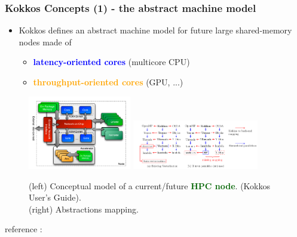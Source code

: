 \begin{frame}
  \frametitle{Kokkos Concepts (1) - the abstract machine model}

  \begin{itemize}
  \item Kokkos defines an abstract machine model for future large shared-memory nodes made of
    \begin{itemize}
    \item \textcolor{blue}{\bf latency-oriented cores} (multicore CPU)
    \item \textcolor{orange}{\bf throughput-oriented cores} (GPU, ...)
    \end{itemize}
  \end{itemize}

  \begin{center}
    \begin{figure}
      \includegraphics[width=4.5cm]{images/kokkos_machine_model}
      \includegraphics[width=5.5cm]{images/kokkos_simd}
      \caption{(left) Conceptual model of a current/future \textcolor{darkgreen}{\bf HPC node}. (Kokkos User's Guide).\\ (right) Abstractions mapping.}
    \end{figure}
  \end{center}
  {\small
     reference : }

\end{frame}


